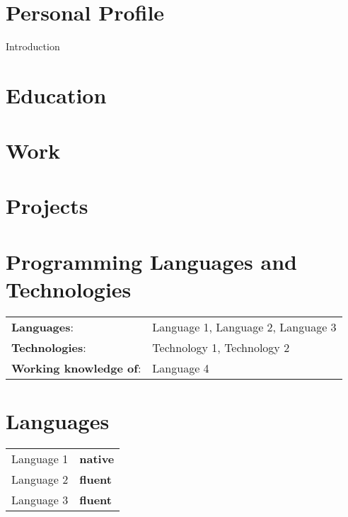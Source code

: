 \documentclass{simple_academic_cv}
\begin{document}
	\name
	\contact\\
	\email\\
	\linkedin\\
	\github
	
	\section{Personal Profile}
	Introduction
		
	\section{Education}
	
	\section{Work}

	\section{Projects}

	\section{Programming Languages and Technologies}
	\begin{tabular}{ll}
		\textbf{Languages}:& Language 1, Language 2, Language 3\\
		\textbf{Technologies}:& Technology 1, Technology 2\\
		\textbf{Working knowledge of}:& Language 4
	\end{tabular}
		
	
	\section{Languages}
	\begin{tabular}{ll}
		Language 1	& \textbf{native}\\
		Language 2	& \textbf{fluent}\\
		Language 3	& \textbf{fluent}
	\end{tabular}
\end{document}
